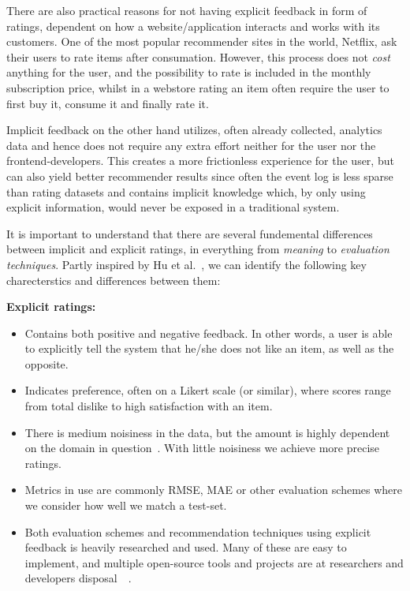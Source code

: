 There are also practical reasons for not having explicit feedback in form of
ratings, dependent on how a website/application interacts and works with its
customers. One of the most popular recommender sites in the world, Netflix, ask
their users to rate items after consumation. However, this process does not
\textit{cost} anything for the user, and the possibility to rate is included in
the monthly subscription price, whilst in a webstore rating an item often
require the user to first buy it, consume it and finally rate it.

Implicit feedback on the other hand utilizes, often already collected,
analytics data and hence does not require any extra effort neither for the user
nor the frontend-developers. This creates a more frictionless experience for
the user, but can also yield better recommender results since often the event
log is less sparse than rating datasets and contains implicit knowledge which,
by only using explicit information, would never be exposed in a traditional
system.

It is important to understand that there are several fundemental differences
between implicit and explicit ratings, in everything from \textit{meaning} to
\textit{evaluation techniques}. Partly inspired by Hu et al.~\cite{Hu2008}, we
can identify the following key charecterstics and differences between them:

\vspace{3 mm}

\textbf{Explicit ratings:}
\begin{itemize}
\item Contains both positive and negative feedback. In other words, a user is
able to explicitly tell the system that he/she does not like an item, as well
as the opposite.
\item Indicates preference, often on a Likert scale (or similar), where scores
range from total dislike to high satisfaction with an item.
\item There is medium noisiness in the data, but the amount is highly dependent
on the domain in question~\cite{amatriain2009like}. With little noisiness we
achieve more precise ratings.
\item Metrics in use are commonly RMSE, MAE or other evaluation schemes where
we consider how well we match a test-set.
\item Both evaluation schemes and recommendation techniques using explicit
feedback is heavily researched and used. Many of these are easy to implement,
and multiple open-source tools and projects are at researchers and developers
disposal~\cite{mahout}~\cite{Gantner2011MyMediaLite}.
\end{itemize}

